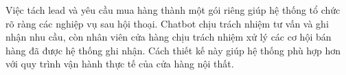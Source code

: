 \documentclass[../DoAn.tex]{subfiles}
\begin{document}
Việc tách lead và yêu cầu mua hàng thành một gói riêng giúp hệ thống tổ chức rõ ràng các nghiệp vụ sau hội thoại. Chatbot chịu trách nhiệm tư vấn và ghi nhận nhu cầu, còn nhân viên cửa hàng chịu trách nhiệm xử lý các cơ hội bán hàng đã được hệ thống ghi nhận. Cách thiết kế này giúp hệ thống phù hợp hơn với quy trình vận hành thực tế của cửa hàng nội thất.

%
\end{document}
